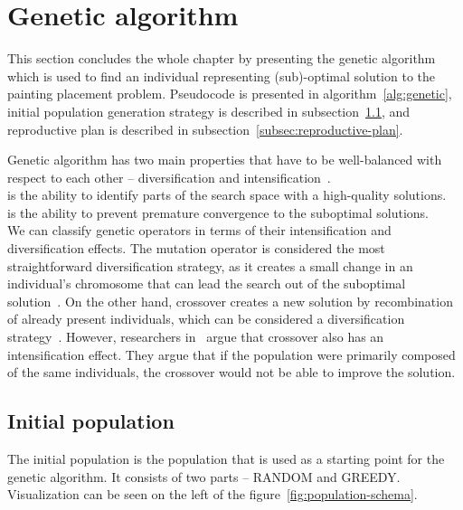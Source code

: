 \clearpage%
\newpage


\section{Genetic algorithm}\label{sec:genetic-algorithm}
This section concludes the whole chapter by presenting the genetic algorithm
which is used to find an individual representing (sub)-optimal solution to the painting placement problem.
Pseudocode is presented in algorithm~\ref{alg:genetic}, initial population generation strategy is described in
subsection~\ref{subsec:initial-population}, and reproductive plan is described in subsection~\ref{subsec:reproductive-plan}.

Genetic algorithm has two main properties that have to be well-balanced with respect to each other
– diversification and intensification~\cite{blumMetaheuristicsCombinatorialOptimization2003}.\\

 is the ability to identify parts of the search space with a high-quality
solutions.\\

 is the ability to prevent premature convergence to the suboptimal solutions.\\

We can classify genetic operators in terms of their intensification and diversification effects.
The mutation operator is considered the most straightforward diversification strategy,
as it creates a small change in an individual's chromosome that can lead the search out of the suboptimal solution~\cite{blumMetaheuristicsCombinatorialOptimization2003}.
On the other hand, crossover creates a new solution by recombination of already present
individuals, which can be considered a diversification strategy~\cite{blumMetaheuristicsCombinatorialOptimization2003}.
However, researchers in~\cite{hanshengBalanceExplorationExploitation1999} argue that crossover
also has an intensification effect.
They argue that if the population were primarily composed of the same individuals, the crossover would not be able to improve the solution.


\subsection{Initial population}\label{subsec:initial-population}
The initial population is the population that is used as a starting point for the genetic algorithm.
It consists of two parts – RANDOM and GREEDY.
Visualization can be seen on the left of the figure~\ref{fig:population-schema}.
\\

